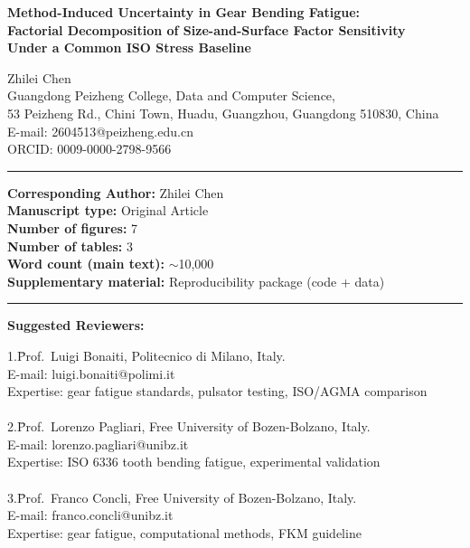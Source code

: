 \documentclass[12pt,a4paper]{article}
\begin{document}
\begin{center}
{\LARGE\bfseries Method-Induced Uncertainty in Gear Bending Fatigue:\\
Factorial Decomposition of Size-and-Surface Factor Sensitivity\\
Under a Common ISO Stress Baseline}
\vspace{1cm}

{\large Zhilei Chen}\\[3pt]
Guangdong Peizheng College, Data and Computer Science,\\
53 Peizheng Rd., Chini Town, Huadu, Guangzhou, Guangdong 510830, China\\[3pt]
E-mail: 2604513@peizheng.edu.cn\\
ORCID: 0009-0000-2798-9566
\vspace{0.8cm}

\rule{\textwidth}{0.5pt}
\vspace{0.5cm}

\textbf{Corresponding Author:} Zhilei Chen\\
\textbf{Manuscript type:} Original Article\\
\textbf{Number of figures:} 7\\
\textbf{Number of tables:} 3\\
\textbf{Word count (main text):} $\sim$10,000\\
\textbf{Supplementary material:} Reproducibility package (code + data)

\vspace{0.5cm}
\rule{\textwidth}{0.5pt}
\vspace{0.5cm}

\textbf{Suggested Reviewers:}\\[3pt]
\begin{tabbing}
1.\quad\=Prof.\ Luigi Bonaiti, Politecnico di Milano, Italy.\\
\>E-mail: luigi.bonaiti@polimi.it\\
\>Expertise: gear fatigue standards, pulsator testing, ISO/AGMA comparison\\
\\
2.\quad\=Prof.\ Lorenzo Pagliari, Free University of Bozen-Bolzano, Italy.\\
\>E-mail: lorenzo.pagliari@unibz.it\\
\>Expertise: ISO 6336 tooth bending fatigue, experimental validation\\
\\
3.\quad\=Prof.\ Franco Concli, Free University of Bozen-Bolzano, Italy.\\
\>E-mail: franco.concli@unibz.it\\
\>Expertise: gear fatigue, computational methods, FKM guideline
\end{tabbing}


\end{center}
\end{document}
